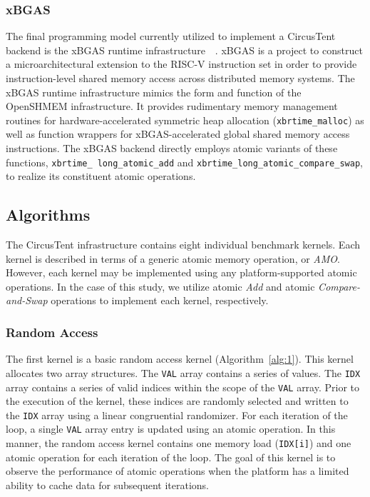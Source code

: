 \subsubsection{xBGAS}
\label{subsubsec:xbgas}
The final programming model currently utilized to implement a CircusTent backend is the xBGAS runtime infrastructure~\cite{leidel2018xbgas}~\cite{xbgasspec}.
xBGAS is a project to construct a microarchitectural extension to the RISC-V instruction set in order to provide instruction-level shared memory access across distributed memory systems.
The xBGAS runtime infrastructure mimics the form and function of the OpenSHMEM infrastructure.
It provides rudimentary memory management routines for hardware-accelerated symmetric heap allocation (\texttt{xbrtime\_malloc}) as well as function wrappers for xBGAS-accelerated global shared memory access instructions.
The xBGAS backend directly employs atomic variants of these functions, \texttt{xbrtime\_ long\_atomic\_add} and \newline \texttt{xbrtime\_long\_atomic\_compare\_swap}, to realize its constituent atomic operations.  

\subsection{Algorithms}
\label{subsec:algorithms}

The CircusTent infrastructure contains eight individual benchmark kernels.
Each kernel is described in terms of a generic atomic memory operation, or \textit{AMO}.  
However, each kernel may be implemented using any platform-supported atomic operations.
In the case of this study, we utilize atomic \textit{Add} and atomic \textit{Compare-and-Swap} operations to implement each kernel, respectively.  

\subsubsection{Random Access}
\label{subsubsec:random_access}

The first kernel is a basic random access kernel (Algorithm~\ref{alg:1}).
This kernel allocates two array structures.
The \texttt{VAL} array contains a series of values.
The \texttt{IDX} array contains a series of valid indices within the scope of the \texttt{VAL} array.
Prior to the execution of the kernel, these indices are randomly selected and written to the \texttt{IDX} array using a linear congruential randomizer.
For each iteration of the loop, a single \texttt{VAL} array entry is updated using an atomic operation.
In this manner, the random access kernel contains one memory load (\texttt{IDX[i]}) and one atomic operation for each iteration of the loop.
The goal of this kernel is to observe the performance of atomic operations when the platform has a limited ability to cache data for subsequent iterations.  

